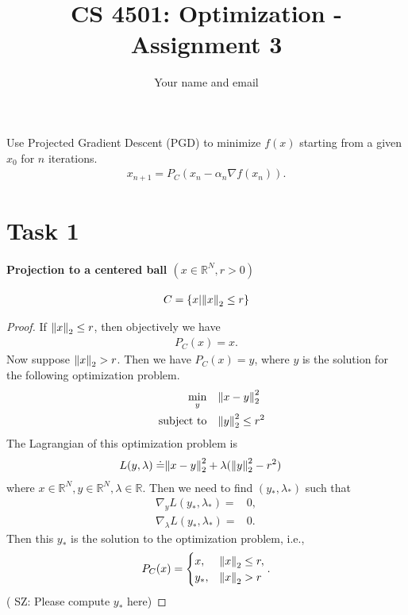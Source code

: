 \documentclass[11pt]{article}
\newcommand{\sz}[1]{({\color{blue} {SZ: #1}})}
\newcommand{\R}{\mathbb{R}}
\begin{document}
\title{CS 4501: Optimization - Assignment 3}
\author{Your name and email}
\date{}
\maketitle

Use Projected Gradient Descent (PGD) to minimize $f(x)$ starting from a given $x_0$ for $n$ iterations.
\begin{align}
  x_{n+1} = P_C\left(x_n - \alpha_n \nabla f(x_n)\right).
\end{align}

\section*{Task 1}
\paragraph*{Projection to a centered ball $(x \in \R^N, r > 0)$}
\begin{align}
  C = \qty{ x | \norm{x}_2 \leq r}
\end{align}
\begin{proof}
  If $\norm{x}_2 \leq r$, then objectively we have
  \begin{align}
    P_C(x) = x.
  \end{align}
  Now suppose $\norm{x}_2 > r$.
  Then we have $P_C(x) = y$, where $y$ is the solution for the following optimization problem.
  \begin{align}
    \min_y \quad & \norm{x - y}_2^2 \\
    \qq{subject to}& \norm{y}_2^2 \leq r^2
  \end{align}
  The Lagrangian of this optimization problem is
  \begin{align}
    L(y, \lambda) \doteq& \norm{x - y}^2_2 + \lambda(\norm{y}^2_2 - r^2)
  \end{align}
  where $x \in \R^N, y \in \R^N, \lambda \in \R$.
  Then we need to find $(y_*, \lambda_*)$ such that
  \begin{align}
    \nabla_y L(y_*, \lambda_*) =& 0, \\
    \nabla_\lambda L(y_*, \lambda_*) =& 0.
  \end{align}
  Then this $y_*$ is the solution to the optimization problem,
  i.e.,
  \begin{align}
    P_C(x) = \begin{cases}
      x, &\norm{x}_2 \leq r, \\
      y_*, &\norm{x}_2 > r
    \end{cases}.
  \end{align}
  \sz{Please compute $y_*$ here}
\end{proof}
\end{document}
